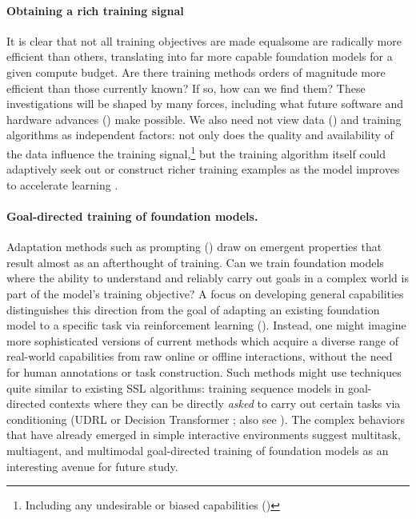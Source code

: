 \paragraph{Obtaining a rich training signal} It is clear that not all training objectives are made equal\dash{}some are radically more efficient than others, translating into far more capable foundation models for a given compute budget. Are there training methods orders of magnitude more efficient than those currently known? If so, how can we find them? These investigations will be shaped by many forces, including what future software and hardware advances () make possible. We also need not view data () and training algorithms as independent factors: not only does the quality and availability of the data influence the training signal,\footnote{Including any undesirable or biased capabilities ()} but the training algorithm itself could adaptively seek out or construct richer training examples as the model improves to accelerate learning \citep{Tamkin2021ViewmakerNL}.

\paragraph{Goal-directed training of foundation models.} Adaptation methods such as prompting () draw on emergent properties that result almost as an afterthought of training. Can we train foundation models where the ability to understand and reliably carry out goals in a complex world is part of the model's training objective? A focus on developing general capabilities distinguishes this direction from the goal of adapting an existing foundation model to a specific task via reinforcement learning (\eg \citet{Stiennon2020LearningTS}). Instead, one might imagine more sophisticated versions of current methods which acquire a diverse range of real-world capabilities from raw online \citep{Klyubin2005EmpowermentAU, singh2005intrinsically, Salge2013EmpowermentA, Mohamed2015VariationalIM, Florensa2017StochasticNN, Pathak2017CuriosityDrivenEB, Haber2018LearningTP} or offline  \citep{Precup2000EligibilityTF, lange2012batch, Ajay2021OPALOP, Yang2021RepresentationMO, Schwarzer2021PretrainingRF} interactions, without the need for human annotations or task construction. Such methods might use techniques quite similar to existing SSL algorithms: \eg training sequence models in goal-directed contexts where they can be directly \textit{asked} to carry out certain tasks via conditioning (\eg UDRL \citep{Schmidhuber2019ReinforcementLU, Srivastava2019TrainingAU} or Decision Transformer \citep{Chen2021DecisionTR}; also see ). The complex behaviors that have already emerged in simple interactive environments  \citep{Baker2020EmergentTU} suggest multitask, multiagent, and multimodal goal-directed training of foundation models as an interesting avenue for future study.